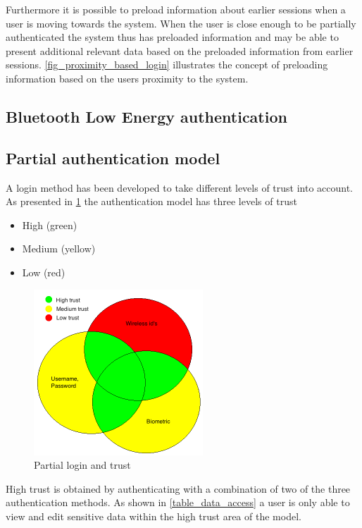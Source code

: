 Furthermore it is possible to preload information about earlier sessions when a user is moving towards the system.
When the user is close enough to be partially authenticated the system thus has preloaded information and may be able to present additional relevant data based on the preloaded information from earlier sessions. 
\cref{fig_proximity_based_login} illustrates the concept of preloading information based on the users proximity to the system.

\subsection{Bluetooth Low Energy authentication}

\subsection{Partial authentication model}
A login method has been developed to take different levels of trust into account.
As presented in \cref{fig_authentication_model} the authentication model has three levels of trust
\begin{itemize}
\item High (green)
\item Medium (yellow)
\item Low (red)
\end{itemize}

\begin{figure}[!t]
	\centering
	\includegraphics[width=2.5in]{img/authenticationModel}
	\caption{ Partial login and trust }
	\label{fig_authentication_model}
\end{figure}

High trust is obtained by authenticating with a combination of two of the three authentication methods.
As shown in \cref{table_data_access} a user is only able to view and edit sensitive data within the high trust area of the model.

